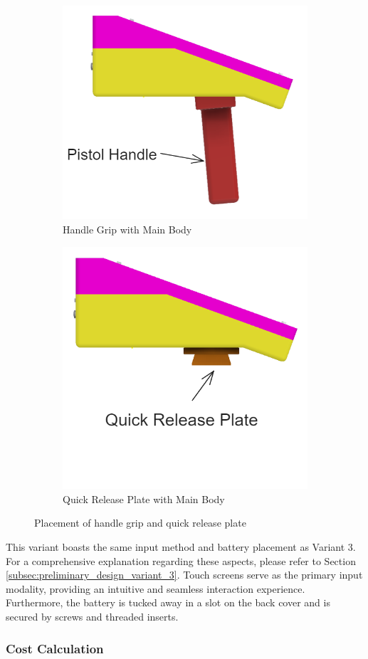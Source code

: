 \begin{figure}[h!]
    \centering
    \begin{subfigure}[c]{0.47\textwidth}
        \begin{minipage}{\textwidth}
            \centering
            \includegraphics[height=4 cm]{texs/Part1/chapter4/image/v63.png}
        \end{minipage}
        \caption{Handle Grip with Main Body}
        \label{fig:variant6_handle_grip_main_body}
    \end{subfigure}
    \begin{subfigure}[c]{0.5\textwidth}
        \begin{minipage}{\textwidth}
            \centering
            \includegraphics[height=4 cm]{texs/Part1/chapter4/image/v64.png}
        \end{minipage}
        \caption{Quick Release Plate with Main Body}
        \label{fig:variant6_quick_release_plate_main_body}
    \end{subfigure}
    \caption{Placement of handle grip and quick release plate}
    \label{fig:variant6_handle_grip_quick_release_plate}
\end{figure}


This variant boasts the same input method and battery placement as Variant 3. For a comprehensive explanation regarding these aspects, please refer to Section \ref{subsec:preliminary_design_variant_3}. Touch screens serve as the primary input modality, providing an intuitive and seamless interaction experience. Furthermore, the battery is tucked away in a slot on the back cover and is secured by screws and threaded inserts.

\subsubsection{Cost Calculation}


